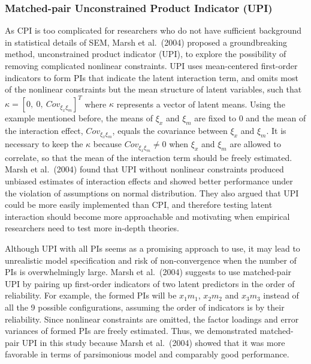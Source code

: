 \documentclass[
  man]{apa7}
\begin{document}
\hypertarget{matched-pair-unconstrained-product-indicator-upi}{%
\subsubsection{Matched-pair Unconstrained Product Indicator (UPI)}\label{matched-pair-unconstrained-product-indicator-upi}}

As CPI is too complicated for researchers who do not have sufficient background in statistical details of SEM, Marsh et al.~(2004) proposed a groundbreaking method, unconstrained product indicator (UPI), to explore the possibility of removing complicated nonlinear constraints. UPI uses mean-centered first-order indicators to form PIs that indicate the latent interaction term, and omits most of the nonlinear constraints but the mean structure of latent variables, such that \(\kappa = [0, \ 0, \ Cov_{\xi_{x}\xi_{m}}]^T\) where \(\kappa\) represents a vector of latent means. Using the example mentioned before, the means of \(\xi_{x}\) and \(\xi_{m}\) are fixed to 0 and the mean of the interaction effect, \(Cov_{\xi_{x}\xi_{m}}\), equals the covariance between \(\xi_{x}\) and \(\xi_{m}\). It is necessary to keep the \(\kappa\) because \(Cov_{\xi_{x}\xi_{m}} \neq 0\) when \(\xi_{x}\) and \(\xi_{m}\) are allowed to correlate, so that the mean of the interaction term should be freely estimated. Marsh et al.~(2004) found that UPI without nonlinear constraints produced unbiased estimates of interaction effects and showed better performance under the violation of assumptions on normal distribution. They also argued that UPI could be more easily implemented than CPI, and therefore testing latent interaction should become more approachable and motivating when empirical researchers need to test more in-depth theories.

Although UPI with all PIs seems as a promising approach to use, it may lead to unrealistic model specification and risk of non-convergence when the number of PIs is overwhelmingly large. Marsh et al.~(2004) suggests to use matched-pair UPI by pairing up first-order indicators of two latent predictors in the order of reliability. For example, the formed PIs will be \(x_{1}m_{1}\), \(x_{2}m_{2}\) and \(x_{3}m_{3}\) instead of all the 9 possible configurations, assuming the order of indicators is by their reliability. Since nonlinear constraints are omitted, the factor loadings and error variances of formed PIs are freely estimated. Thus, we demonstrated matched-pair UPI in this study because Marsh et al.~(2004) showed that it was more favorable in terms of parsimonious model and comparably good performance.
\end{document}
